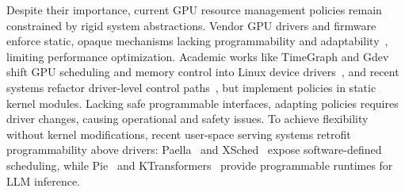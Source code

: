 

Despite their importance, current GPU resource management policies remain constrained by rigid system abstractions. Vendor GPU drivers and firmware enforce static, opaque mechanisms lacking programmability and adaptability~\cite{nvidia-open-gpu}, limiting performance optimization. Academic works like TimeGraph and Gdev shift GPU scheduling and memory control into Linux device drivers~\cite{kato2011timegraph,kato2012gdev}, and recent systems refactor driver-level control paths~\cite{kernelintercept,fan2025gpreempt,wang2024gcaps}, but implement policies in static kernel modules. Lacking safe programmable interfaces, adapting policies requires driver changes, causing operational and safety issues. To achieve flexibility without kernel modifications, recent user-space serving systems retrofit programmability above drivers: Paella~\cite{ng2023paella} and XSched~\cite{shen2025xsched} expose software-defined scheduling, while Pie~\cite{gim2025pie} and KTransformers~\cite{chen2025ktransformers} provide programmable runtimes for LLM inference. 
